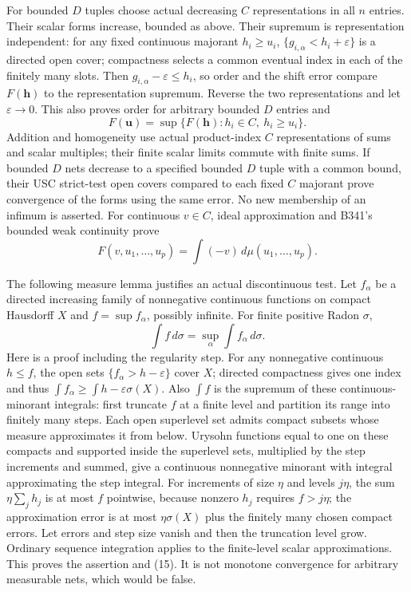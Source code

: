 \documentclass[
  11pt,
]{article}
\begin{document}
For bounded \(D\) tuples choose actual decreasing \(C\) representations
in all \(n\) entries. Their scalar forms increase, bounded as above.
Their supremum is representation independent: for any fixed continuous
majorant \(h_i\ge u_i\), \(\{g_{i,\alpha}<h_i+\varepsilon\}\) is a
directed open cover; compactness selects a common eventual index in each
of the finitely many slots. Then \(g_{i,\alpha}-\varepsilon\le h_i\), so
order and the shift error compare \(F(\boldsymbol h)\) to the
representation supremum. Reverse the two representations and let
\(\varepsilon\to0\). This also proves order for arbitrary bounded \(D\)
entries and
\[F(\boldsymbol u)=\sup\{F(\boldsymbol h):h_i\in C,\ h_i\ge u_i\}.\tag{13}\]
Addition and homogeneity use actual product-index \(C\) representations
of sums and scalar multiples; their finite scalar limits commute with
finite sums. If bounded \(D\) nets decrease to a specified bounded \(D\)
tuple with a common bound, their USC strict-test open covers compared to
each fixed \(C\) majorant prove convergence of the forms using the same
error. No new membership of an infimum is asserted. For continuous
\(v\in C\), ideal approximation and B341's bounded weak continuity prove
\[F(v,u_1,\ldots,u_p)=\int(-v)\,d\mu(u_1,\ldots,u_p).\tag{14}\]

The following measure lemma justifies an actual discontinuous test. Let
\(f_\alpha\) be a directed increasing family of nonnegative continuous
functions on compact Hausdorff \(X\) and \(f=\sup f_\alpha\), possibly
infinite. For finite positive Radon \(\sigma\),
\[\int f\,d\sigma=\sup_\alpha\int f_\alpha\,d\sigma.\tag{15}\] Here is a
proof including the regularity step. For any nonnegative continuous
\(h\le f\), the open sets \(\{f_\alpha>h-\varepsilon\}\) cover \(X\);
directed compactness gives one index and thus
\(\int f_\alpha\ge\int h-\varepsilon\sigma(X)\). Also \(\int f\) is the
supremum of these continuous-minorant integrals: first truncate \(f\) at
a finite level and partition its range into finitely many steps. Each
open superlevel set admits compact subsets whose measure approximates it
from below. Urysohn functions equal to one on these compacts and
supported inside the superlevel sets, multiplied by the step increments
and summed, give a continuous nonnegative minorant with integral
approximating the step integral. For increments of size \(\eta\) and
levels \(j\eta\), the sum \(\eta\sum_j h_j\) is at most \(f\) pointwise,
because nonzero \(h_j\) requires \(f>j\eta\); the approximation error is
at most \(\eta\sigma(X)\) plus the finitely many chosen compact errors.
Let errors and step size vanish and then the truncation level grow.
Ordinary sequence integration applies to the finite-level scalar
approximations. This proves the assertion and (15). It is not monotone
convergence for arbitrary measurable nets, which would be false.
\end{document}
